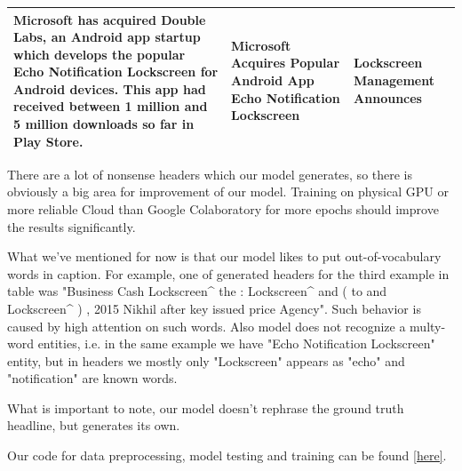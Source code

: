 \begin{center}
\begin{table}[!htb]
\begin{tabular}{|l|l|l|}
\begin{minipage}[t]{0.4\columnwidth}%
Microsoft has acquired Double Labs, an Android app startup which develops the popular Echo Notification Lockscreen for Android devices. This app had received between 1 million and 5 million downloads so far in Play Store.          
\end{minipage}
 & 
\begin{minipage}[t]{0.3\columnwidth}%
Microsoft Acquires Popular Android App Echo Notification Lockscreen
\end{minipage}
 & 
\begin{minipage}[t]{0.3\columnwidth}%
Lockscreen Management Announces
\end{minipage}  \\ \hline

\end{tabular}
\end{table}
\end{center}

There are a lot of nonsense headers which our model generates, so there is obviously a big area for improvement of our model. Training on physical GPU or more reliable Cloud than Google Colaboratory for more epochs should improve the results significantly. 

What we've mentioned for now is that our model likes to put out-of-vocabulary words in caption. For example, one of generated headers for the third example in table was "Business Cash Lockscreen\^{} the : Lockscreen\^{} and ( to and Lockscreen\^{} ) , 2015 Nikhil after key issued price Agency". Such behavior is caused by high attention on such words. Also model does not recognize a multy-word entities, i.e. in the same example we have "Echo Notification Lockscreen" entity, but in headers we mostly only "Lockscreen" appears as "echo" and "notification" are known words.

What is important to note, our model doesn't rephrase the ground truth headline, but generates its own.

Our code for data preprocessing, model testing and training can be found \href{https://github.com/mykhaly/text_summarization_using_LSTM}{[here]}.


